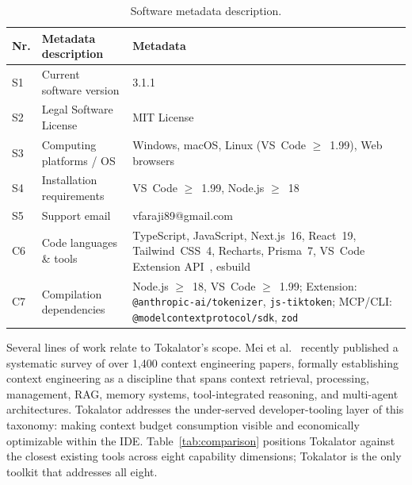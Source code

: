 \documentclass[a4paper,fleqn]{cas-dc}
\begin{document}
\begin{table}[t]
\centering
\small
\caption{Software metadata description.}
\label{executabelMetadata}
\begin{tabular}{@{} l p{4.2cm} p{8.5cm} @{}}
\toprule
\textbf{Nr.} & \textbf{Metadata description} & \textbf{Metadata} \\
\midrule
S1 & Current software version & 3.1.1 \\
\addlinespace
S2 & Legal Software License & MIT License \\
\addlinespace
S3 & Computing platforms / OS & Windows, macOS, Linux (VS~Code $\geq$~1.99), Web browsers \\
\addlinespace
S4 & Installation requirements & VS~Code $\geq$~1.99, Node.js $\geq$~18 \\
\addlinespace
S5 & Support email & vfaraji89@gmail.com \\
\addlinespace
C6 & Code languages \& tools & TypeScript, JavaScript, Next.js~16, React~19, Tailwind~CSS~4, Recharts, Prisma~7, VS~Code Extension API~\cite{vscode2026api}, esbuild \\
\addlinespace
C7 & Compilation dependencies & Node.js $\geq$~18, VS~Code $\geq$~1.99; Extension: \texttt{@anthropic-ai/tokenizer}, \texttt{js-tiktoken}; MCP/CLI: \texttt{@modelcontextprotocol/sdk}, \texttt{zod} \\
\bottomrule
\end{tabular}
\end{table}




Several lines of work relate to Tokalator's scope. Mei et al.~\cite{mei2025survey} recently published a systematic survey of over 1,400 context engineering papers, formally establishing context engineering as a discipline that spans context retrieval, processing, management, RAG, memory systems, tool-integrated reasoning, and multi-agent architectures. Tokalator addresses the under-served developer-tooling layer of this taxonomy: making context budget consumption visible and economically optimizable within the IDE. Table~\ref{tab:comparison} positions Tokalator against the closest existing tools across eight capability dimensions; Tokalator is the only toolkit that addresses all eight.
\end{document}

